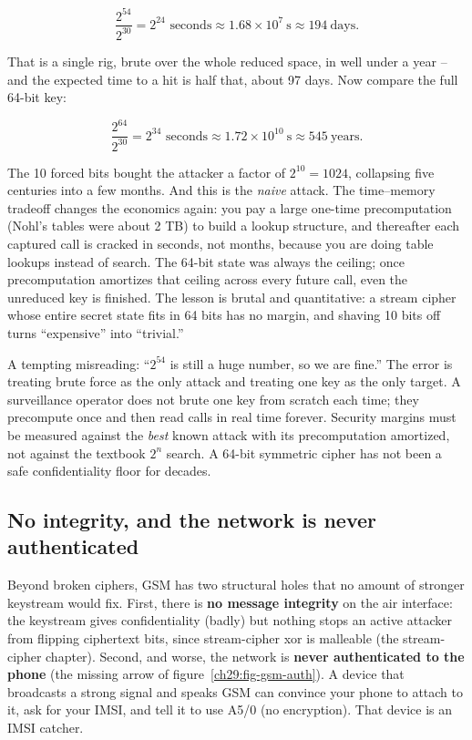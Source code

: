 \[
  \frac{2^{54}}{2^{30}} = 2^{24} \text{ seconds} \approx 1.68\times 10^{7}\ \text{s} \approx 194\ \text{days}.
\]

That is a single rig, brute over the whole reduced space, in well under a year -- and the expected time to a hit is half that, about 97 days. Now compare the full 64-bit key:

\[
  \frac{2^{64}}{2^{30}} = 2^{34} \text{ seconds} \approx 1.72\times 10^{10}\ \text{s} \approx 545\ \text{years}.
\]

The 10 forced bits bought the attacker a factor of $2^{10} = 1024$, collapsing five centuries into a few months. And this is the \emph{naive} attack. The time--memory tradeoff changes the economics again: you pay a large one-time precomputation (Nohl's tables were about 2 TB) to build a lookup structure, and thereafter each captured call is cracked in seconds, not months, because you are doing table lookups instead of search. The 64-bit state was always the ceiling; once precomputation amortizes that ceiling across every future call, even the unreduced key is finished. The lesson is brutal and quantitative: a stream cipher whose entire secret state fits in 64 bits has no margin, and shaving 10 bits off turns ``expensive'' into ``trivial.''

\begin{trapbox}
A tempting misreading: ``$2^{54}$ is still a huge number, so we are fine.'' The error is treating brute force as the only attack and treating one key as the only target. A surveillance operator does not brute one key from scratch each time; they precompute once and then read calls in real time forever. Security margins must be measured against the \emph{best} known attack with its precomputation amortized, not against the textbook $2^{n}$ search. A 64-bit symmetric cipher has not been a safe confidentiality floor for decades.
\end{trapbox}

\subsection{No integrity, and the network is never authenticated}
\label{ch29:gsm-noint}

Beyond broken ciphers, GSM has two structural holes that no amount of stronger keystream would fix. First, there is \textbf{no message integrity} on the air interface: the keystream gives confidentiality (badly) but nothing stops an active attacker from flipping ciphertext bits, since stream-cipher xor is malleable (the stream-cipher chapter). Second, and worse, the network is \textbf{never authenticated to the phone} (the missing arrow of figure~\ref{ch29:fig-gsm-auth}). A device that broadcasts a strong signal and speaks GSM can convince your phone to attach to it, ask for your IMSI, and tell it to use A5/0 (no encryption). That device is an IMSI catcher.

